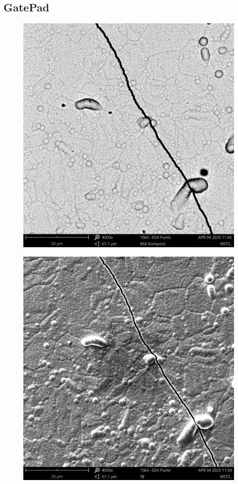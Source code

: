   \subsection{GatePad}
    \begin{figure}[H]
        \centering
        \begin{minipage}{.5\textwidth}
          \centering
          \includegraphics[width=.9\linewidth]{Bilder/MST2_0002}
          \label{Abb.2: REM-Aufnahme(BSE Komposit, 4000x) des GatePads mit Punktanalyse}
        \end{minipage}%
        \begin{minipage}{.5\textwidth}
          \centering
          \includegraphics[width=.9\linewidth]{Bilder/MST2_0005}

\end{minipage}
\end{figure}
